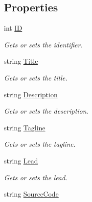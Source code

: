 \subsection*{Properties}
\begin{DoxyCompactItemize}
\item 
int \hyperlink{class_open_1_1_g_i_1_1hypermart_1_1_models_1_1_product_a4fedd3f62a9c36939c6e45ea2e8cd011}{ID}
\begin{DoxyCompactList}\small\item\em Gets or sets the identifier. \end{DoxyCompactList}\item 
string \hyperlink{class_open_1_1_g_i_1_1hypermart_1_1_models_1_1_product_a877241a61c423e91b6b630df5ca811d0}{Title}
\begin{DoxyCompactList}\small\item\em Gets or sets the title. \end{DoxyCompactList}\item 
string \hyperlink{class_open_1_1_g_i_1_1hypermart_1_1_models_1_1_product_a8d7cb8cd22f77fa66f06726400b1381e}{Description}
\begin{DoxyCompactList}\small\item\em Gets or sets the description. \end{DoxyCompactList}\item 
string \hyperlink{class_open_1_1_g_i_1_1hypermart_1_1_models_1_1_product_ad0233eb35ac4048277a4eafde6432c43}{Tagline}
\begin{DoxyCompactList}\small\item\em Gets or sets the tagline. \end{DoxyCompactList}\item 
string \hyperlink{class_open_1_1_g_i_1_1hypermart_1_1_models_1_1_product_a646bc5e183ba8d87c06d290398e6bee6}{Lead}
\begin{DoxyCompactList}\small\item\em Gets or sets the lead. \end{DoxyCompactList}\item 
string \hyperlink{class_open_1_1_g_i_1_1hypermart_1_1_models_1_1_product_ab5fd5620220d0e68053208859137a6cb}{Source\+Code}

\end{DoxyCompactItemize}
